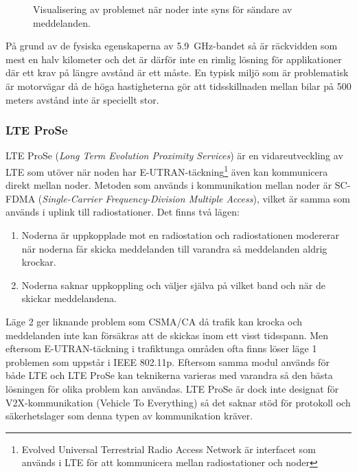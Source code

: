 \documentclass[a4paper]{IEEEtran}
\begin{document}
\begin{figure}
	\begin{center}
	\end{center}
	\caption{Visualisering av problemet när noder inte syns för sändare av meddelanden.}
	\label{Img:HiddenNode}
\end{figure}

På grund av de fysiska egenskaperna av 5.9~GHz-bandet så är räckvidden som mest en halv kilometer och det är därför inte en rimlig lösning för applikationer där ett krav på längre avstånd är ett måste. 
En typisk miljö som är problematisk är motorvägar då de höga hastigheterna gör att tidsskillnaden mellan bilar på 500 meters avstånd inte är speciellt stor. \cite{5GPPP}
\subsubsection{LTE ProSe}
LTE ProSe (\emph{Long Term Evolution Proximity Services}) är en vidareutveckling av LTE som utöver när noden har E-UTRAN-täckning\footnote{Evolved Universal Terrestrial Radio Access Network är interfacet som används i LTE för att kommunicera mellan radiostationer och noder} även kan kommunicera direkt mellan noder.
Metoden som används i kommunikation mellan noder är SC-FDMA (\emph{Single-Carrier Frequency-Division Multiple Access}), vilket är samma som används i uplink till radiostationer. Det finns två lägen:
\begin{enumerate}
	\item Noderna är uppkopplade mot en radiostation och radiostationen modererar när noderna får skicka meddelanden till varandra så meddelanden aldrig krockar.
	\item Noderna saknar uppkoppling och väljer själva på vilket band och när de skickar meddelandena.
\end{enumerate}
Läge 2 ger liknande problem som CSMA/CA då trafik kan krocka och meddelanden inte kan försäkras att de skickas inom ett visst tidsspann.
Men eftersom E-UTRAN-täckning i trafiktunga områden ofta finns löser läge 1 problemen som uppstår i IEEE 802.11p.
Eftersom samma modul används för både LTE och LTE ProSe kan teknikerna varieras med varandra så den bästa lösningen för olika problem kan användas.
LTE ProSe är dock inte designat för V2X-kommunikation (Vehicle To Everything) så det saknar stöd för protokoll och säkerhetslager som denna typen av kommunikation kräver.
\end{document}
